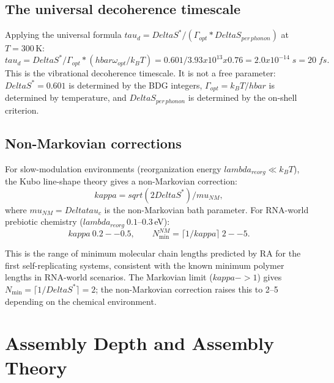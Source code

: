 \documentclass[11pt]{article}
\DeclareRobustCommand{\hbar}{\ensuremath{\hslash}}
\def\hbar{hbar}%
\def\Delta{Delta}%
\def\mu{mu}%
\def\tau{tau}%
\def\kappa{kappa}%
\def\lambda{lambda}%
\def\mathrm#1{#1}%
\def\text#1{#1}%
\def\sqrt#1{sqrt(#1)}%
\def\frac#1#2{#1/#2}%
\def\cdot{*}%
\def\times{x}%
\def\approx{~}%
\def\to{->}%
\begin{document}
\subsection{The universal decoherence timescale}

Applying the universal formula $\tau_d=\Delta S^*/(\Gamma_{\mathrm{opt}}\cdot\Delta S_{\mathrm{per\,phonon}})$ at $T=300$\,K:
\begin{equation}
\tau_d = \frac{\Delta S^*}{\Gamma_{\mathrm{opt}}\cdot(\hbar\omega_{\mathrm{opt}}/k_BT)} = \frac{0.601}{3.93\times 10^{13}\times 0.76} = 2.0\times 10^{-14}\;\mathrm{s} = 20\;\mathrm{fs}.
\end{equation}
This is the vibrational decoherence timescale. It is not a free parameter: $\Delta S^*=0.601$ is determined by the BDG integers, $\Gamma_{\mathrm{opt}}=k_BT/\hbar$ is determined by temperature, and $\Delta S_{\mathrm{per\,phonon}}$ is determined by the on-shell criterion.

\subsection{Non-Markovian corrections}

For slow-modulation environments (reorganization energy $\lambda_{\mathrm{reorg}}\ll k_BT$), the Kubo line-shape theory gives a non-Markovian correction:
\begin{equation}
\kappa = \frac{\sqrt{2\Delta S^*}}{\mu_{\mathrm{NM}}},
\end{equation}
where $\mu_{\mathrm{NM}}=\Delta\tau_c$ is the non-Markovian bath parameter. For RNA-world prebiotic chemistry ($\lambda_{\mathrm{reorg}}\approx 0.1$--$0.3$\,eV):
\begin{equation}
\kappa\approx 0.2\text{--}0.5, \qquad N_{\min}^{\mathrm{NM}}=\lceil 1/\kappa\rceil \approx 2\text{--}5.
\end{equation}

This is the range of minimum molecular chain lengths predicted by RA for the first self-replicating systems, consistent with the known minimum polymer lengths in RNA-world scenarios. The Markovian limit ($\kappa\to 1$) gives $N_{\min}=\lceil 1/\Delta S^*\rceil=2$; the non-Markovian correction raises this to 2--5 depending on the chemical environment.

\section{Assembly Depth and Assembly Theory}
\label{sec:assembly}
\end{document}
